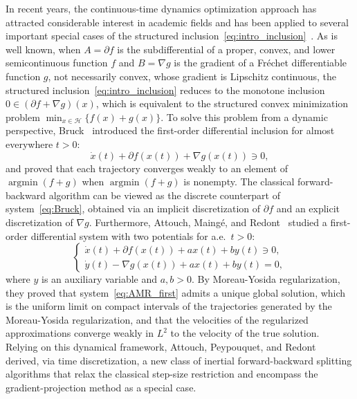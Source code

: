 \documentclass{article}
\theoremstyle{definition}
\theoremstyle{definition}
\theoremstyle{definition}
\begin{document}
In recent years, the continuous-time dynamics optimization approach has attracted considerable interest in academic fields and has been applied to several important special cases of the structured inclusion~\eqref{eq:intro_inclusion}~\cite{Bruck1975, attouch2012second, attouch2014dynamical}. As is well known, when $A=\partial f$ is the subdifferential of a proper, convex, and lower semicontinuous function $f$ and $B=\nabla g$ is the gradient of a Fr\'{e}chet differentiable function $g$, not necessarily convex, whose gradient is Lipschitz continuous, the structured inclusion~\eqref{eq:intro_inclusion} reduces to the monotone inclusion $0\in(\partial f+\nabla g)(x)$, which is equivalent to the structured convex minimization problem $\min_{x\in\mathcal{H}}\{f(x)+g(x)\}$. To solve this problem from a dynamic perspective, Bruck~\cite{Bruck1975} introduced the first-order differential inclusion for almost everywhere $t>0$:
\begin{equation}\label{eq:Bruck}
\dot{x}(t)+\partial f(x(t))+\nabla g(x(t))\ni0,
\end{equation}
and proved that each trajectory converges weakly to an element of $\operatorname{argmin}(f+g)$ when $\operatorname{argmin}(f+g)$ is nonempty. The classical forward-backward algorithm can be viewed as the discrete counterpart of system~\eqref{eq:Bruck}, obtained via an implicit discretization of $\partial f$ and an explicit discretization of $\nabla g$.
Furthermore, Attouch, Maing\'{e}, and Redont~\cite{attouch2012second} studied a first-order differential system with two potentials for a.e.\ $t>0$:
\begin{equation}\label{eq:AMR_first}
\left\{\begin{array}{l}
\dot{x}(t)+\partial f(x(t))+a x(t)+b y(t)\ni0,\\[2pt]
\dot{y}(t)-\nabla g(x(t))+a x(t)+b y(t)=0,
\end{array}\right.
\end{equation}
where $y$ is an auxiliary variable and $a,b>0$. By Moreau-Yosida regularization, they proved that system~\eqref{eq:AMR_first} admits a unique global solution, which is the uniform limit on compact intervals of the trajectories generated by the Moreau-Yosida regularization, and that the velocities of the regularized approximations converge weakly in $L^{2}$ to the velocity of the true solution. Relying on this dynamical framework, Attouch, Peypouquet, and Redont~\cite{attouch2014dynamical} derived, via time discretization, a new class of inertial forward-backward splitting algorithms that relax the classical step-size restriction and encompass the gradient-projection method as a special case.
\end{document}
